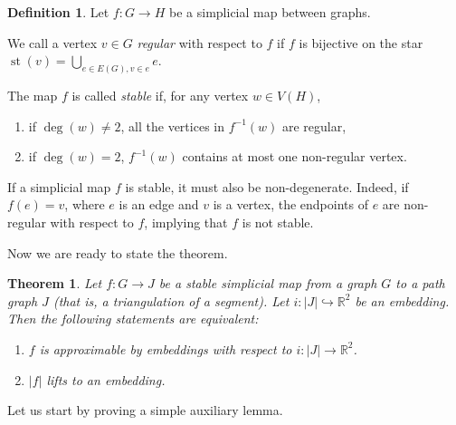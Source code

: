 \documentclass[a4paper,12pt,reqno,oneside]{amsart}
\theoremstyle{plain}
\newtheorem{theorem}{Theorem}
\theoremstyle{definition}
\newtheorem*{definition}{Definition}
\theoremstyle{plain}
\newcommand{\from}{\colon}
\newcommand{\R}{\mathbb{R}}
\DeclareMathOperator{\st}{st}
\begin{document}
\begin{definition}
  Let $f \from G \to H$ be a simplicial map between graphs.

  We call a vertex $v \in G$ \emph{regular} with respect to $f$ if $f$ is bijective on the star
  $\st(v) = \bigcup_{e \in E(G), v \in e} e$.

  The map $f$ is called \emph{stable} if, for any vertex $w \in V(H)$,
  \begin{enumerate}
  \item if $\deg(w) \neq 2$, all the vertices in $f^{-1}(w)$ are regular,
  \item if $\deg(w) = 2$, $f^{-1}(w)$ contains at most one non-regular vertex.
  \end{enumerate}
\end{definition}

If a simplicial map $f$ is stable, it must also be non-degenerate. Indeed, if $f(e) = v$, where $e$
is an edge and $v$ is a vertex, the endpoints of $e$ are non-regular with respect to $f$, implying
that $f$ is not stable.

Now we are ready to state the theorem.

\begin{theorem}\label{thm:approx}
  Let $f \from G \to J$ be a stable simplicial map from a graph $G$ to a path graph $J$ (that is, a
  triangulation of a segment). Let $i \from |J| \hookrightarrow \R^2$ be an embedding. Then the
  following statements are equivalent:
  \begin{enumerate}
  \item $f$ is approximable by embeddings with respect to $i \from |J| \to \R^2$.
  \item $|f|$ lifts to an embedding.
  \end{enumerate}
\end{theorem}

Let us start by proving a simple auxiliary lemma.
\end{document}
